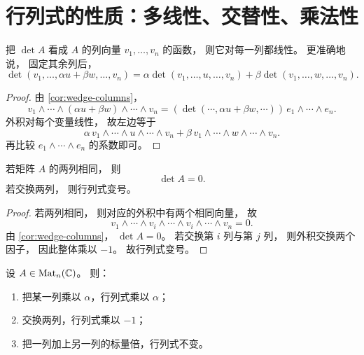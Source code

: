 \section{行列式的性质：多线性、交替性、乘法性}




\begin{proposition}[按列多线性]\label{prop:multilinear-columns} 把 \(\det A\) 看成 \(A\) 的列向量 \(v_1,\dots,v_n\) 的函数， 则它对每一列都线性。 更准确地说， 固定其余列后， \[ \det(v_1,\dots,\alpha u+\beta w,\dots,v_n) = \alpha \det(v_1,\dots,u,\dots,v_n) + \beta \det(v_1,\dots,w,\dots,v_n). \] \end{proposition}




\begin{proof} 由 \cref{cor:wedge-columns}， \[ v_1\wedge\cdots\wedge(\alpha u+\beta w)\wedge\cdots\wedge v_n = (\det(\cdots,\alpha u+\beta w,\cdots))\,e_1\wedge\cdots\wedge e_n. \] 外积对每个变量线性， 故左边等于 \[ \alpha\,v_1\wedge\cdots\wedge u\wedge\cdots\wedge v_n + \beta\,v_1\wedge\cdots\wedge w\wedge\cdots\wedge v_n. \] 再比较 \(e_1\wedge\cdots\wedge e_n\) 的系数即可。 \end{proof}




\begin{proposition}[交替性]\label{prop:alternating} 若矩阵 \(A\) 的两列相同， 则 \[ \det A=0. \] 若交换两列， 则行列式变号。 \end{proposition}




\begin{proof} 若两列相同， 则对应的外积中有两个相同向量， 故 \[ v_1\wedge\cdots\wedge v_i\wedge\cdots\wedge v_i\wedge\cdots\wedge v_n=0. \] 由 \cref{cor:wedge-columns}， \(\det A=0\)。 若交换第 \(i\) 列与第 \(j\) 列， 则外积交换两个因子， 因此整体乘以 \(-1\)。 故行列式变号。 \end{proof}




\begin{corollary}[初等列变换] 设 \(A\in \mathrm{Mat}_n(\mathbb{C})\)。 则：




\begin{enumerate}[label=(\arabic*), leftmargin=2.8em] \item 把某一列乘以 \(\alpha\)，行列式乘以 \(\alpha\)； \item 交换两列，行列式乘以 \(-1\)； \item 把一列加上另一列的标量倍，行列式不变。 \end{enumerate} \end{corollary}




